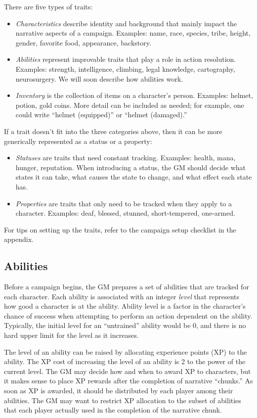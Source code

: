 There are five types of traits:
\begin{itemize}
\item
\emph{Characteristics} describe identity and background that mainly impact the narrative aspects of a campaign.
Examples: name, race, species, tribe, height, gender, favorite food, appearance, backstory.
\item
\emph{Abilities} represent improvable traits that play a role in action resolution.
Examples: strength, intelligence, climbing, legal knowledge, cartography, neurosurgery.
We will soon describe how abilities work.
\item
\emph{Inventory} is the collection of items on a character’s person.
Examples: helmet, potion, gold coins.
More detail can be included as needed; for example, one could write ``helmet (equipped)'' or ``helmet (damaged).''
\end{itemize}
If a trait doesn’t fit into the three categories above, then it can be more generically represented as a status or a property:
\begin{itemize}
\item
\emph{Statuses} are traits that need constant tracking.
Examples: health, mana, hunger, reputation.
When introducing a status, the GM should decide what states it can take, what causes the state to change, and what effect each state has.
\item
\emph{Properties} are traits that only need to be tracked when they apply to a character.
Examples: deaf, blessed, stunned, short-tempered, one-armed.
\end{itemize}

For tips on setting up the traits, refer to the campaign setup checklist in the appendix.

\subsection{Abilities}
\label{sec:abilities}
Before a campaign begins, the GM prepares a set of abilities that are tracked for each character.
Each ability is associated with an integer \emph{level} that represents how good a character is at the ability.
Ability level is a factor in the character’s chance of success when attempting to perform an action dependent on the ability.
Typically, the initial level for an ``untrained'' ability would be $0$, and there is no hard upper limit for the level as it increases.

The level of an ability can be raised by allocating experience points (XP) to the ability.
The XP cost of increasing the level of an ability is 2 to the power of the current level.
The GM may decide how and when to award XP to characters, but it makes sense to place XP rewards after the completion of narrative ``chunks.''
As soon as XP is awarded, it should be distributed by each player among their abilities.
The GM may want to restrict XP allocation to the subset of abilities that each player actually used in the completion of the narrative chunk.

